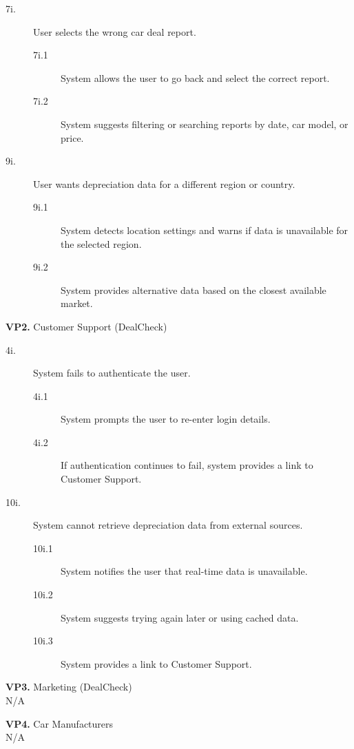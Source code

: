 \documentclass[]{article}
\begin{document}
\begin{enumerate}[{\bf {BE}1.}]
\begin{description}
			\item[7i.] User selects the wrong car deal report.
			\begin{description}
				\item[7i.1] System allows the user to go back and select the correct report.
				\item[7i.2] System suggests filtering or searching reports by date, car model, or price.
			\end{description}
			
			\item[9i.] User wants depreciation data for a different region or country.
			\begin{description}
				\item[9i.1] System detects location settings and warns if data is unavailable for the selected region.
				\item[9i.2] System provides alternative data based on the closest available market.
			\end{description}
		\end{description}  
		
		\textbf{VP2.} Customer Support (DealCheck)

		\begin{description}
			\item[4i.] System fails to authenticate the user.
			\begin{description}
				\item[4i.1] System prompts the user to re-enter login details.
				\item[4i.2] If authentication continues to fail, system provides a link to Customer Support.
			\end{description}

			\item[10i.] System cannot retrieve depreciation data from external sources.
			\begin{description}
				\item[10i.1] System notifies the user that real-time data is unavailable.
				\item[10i.2] System suggests trying again later or using cached data.
				\item[10i.3] System provides a link to Customer Support.
			\end{description}
		\end{description}

		\textbf{VP3.} Marketing (DealCheck) \\ N/A  

		\textbf{VP4.} Car Manufacturers \\ N/A  


\end{enumerate}
\end{document}
